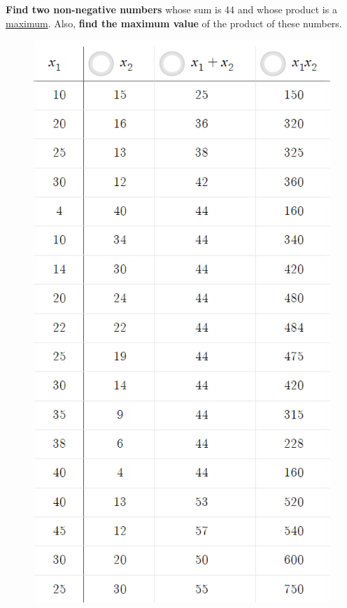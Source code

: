 \begin{example}
\textbf{Find two non-negative numbers} whose sum is 44 and whose product is a \underline{maximum}. Also, \textbf{find the maximum value} of the product of these numbers.
\begin{multicols}{2}
    \begin{minipage}{0.4\textwidth}
        \begin{figure}[H]
		\flushleft
		\includegraphics[scale=0.65]{images/appliedOptimization/Optimization_maxProduct2.PNG}

\end{figure}
\end{minipage}
\end{multicols}
\end{example}

